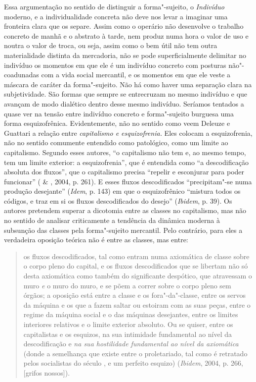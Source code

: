 Essa argumentação no sentido de distinguir a forma"-sujeito, o
\emph{Indivíduo} moderno, e a individualidade concreta não deve nos
levar a imaginar uma fronteira clara que os separe. Assim como o
operário não desenvolve o trabalho concreto de manhã e o abstrato à
tarde, nem produz numa hora o valor de uso e noutra o valor de troca, ou
seja, assim como o bem útil não tem outra materialidade distinta da
mercadoria, não se pode superficialmente delimitar no indivíduo os
momentos em que ele é um indivíduo concreto com posturas não"-coadunadas
com a vida social mercantil, e os momentos em que ele veste a máscara de
caráter da forma"-sujeito. Não há como haver uma separação clara na
subjetividade. São formas que sempre se entrecruzam no mesmo indivíduo e
que avançam de modo dialético dentro desse mesmo indivíduo. Seríamos
tentados a quase ver na tensão entre indivíduo concreto e forma"-sujeito
burguesa uma forma esquizofrênica. Evidentemente, não no sentido como
veem Deleuze e Guattari a relação entre \emph{capitalismo e
esquizofrenia.} Eles colocam a esquizofrenia, não no sentido comumente
entendido como patológico, como um limite ao capitalismo. Segundo esses
autores, ``o capitalismo não tem e, ao mesmo tempo, tem um limite
exterior: a esquizofrenia'', que é entendida como ``a descodificação
absoluta dos fluxos'', que o capitalismo precisa ``repelir e esconjurar
para poder funcionar'' ( \& , 2004, p. 261). E esses
fluxos descodificados ``precipitam"-se numa produção desejante''
(\emph{Idem}, p. 143) em que o esquizofrênico ``mistura todos os
códigos, e traz em si os fluxos descodificados do desejo''
(\emph{Ibidem}, p. 39). Os autores pretendem superar a dicotomia entre as
classes no capitalismo, mas não no sentido de analisar criticamente a
tendência da dinâmica moderna à subsunção das classes pela forma"-sujeito
mercantil. Pelo contrário, para eles a verdadeira oposição teórica não é
entre as classes, mas entre:

\begin{quote}
os fluxos descodificados, tal como entram numa axiomática de classe
sobre o corpo pleno do capital, e os fluxos descodificados que se
libertam não só desta axiomática como também do significante despótico,
que atravessam o muro \emph{e} o muro do muro, e se põem a correr sobre
o corpo pleno sem órgãos; a oposição está entre a classe e os
fora"-da"-classe, entre os servos da máquina e os que a fazem saltar ou
estoiram com as suas peças, entre o regime da máquina social e o das
máquinas desejantes, entre os limites interiores relativos e o limite
exterior absoluto. Ou se quiser, entre os capitalistas e os esquizos, na
sua intimidade fundamental ao nível da descodificação e \emph{na sua
hostilidade fundamental ao nível da axiomática} (donde a semelhança que
existe entre o proletariado, tal como é retratado pelos socialistas do
século , e um perfeito esquizo) (\emph{Ibidem}, 2004, p. 266, [grifos nossos]).
\end{quote}

